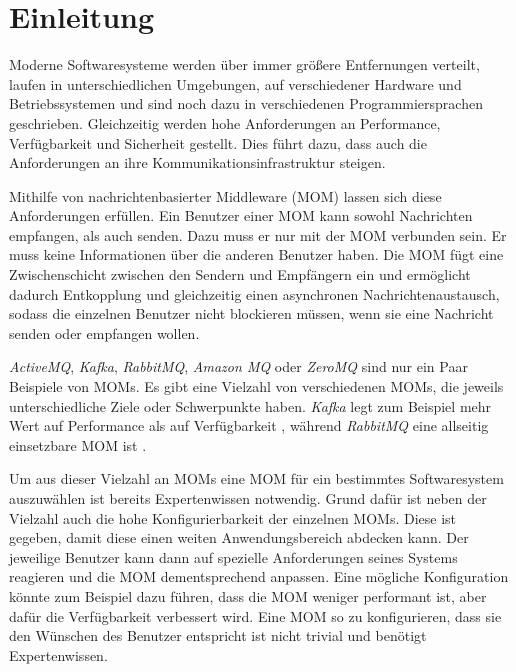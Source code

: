 
\chapter{Einleitung}
\label{ch:Introduction}
Moderne Softwaresysteme werden über immer größere Entfernungen verteilt, laufen in unterschiedlichen Umgebungen, auf verschiedener Hardware und Betriebssystemen und sind noch dazu in verschiedenen Programmiersprachen geschrieben. Gleichzeitig werden hohe Anforderungen an Performance, Verfügbarkeit und Sicherheit gestellt. Dies führt dazu, dass auch die Anforderungen an ihre Kommunikationsinfrastruktur steigen. \par
Mithilfe von nachrichtenbasierter Middleware (MOM) lassen sich diese Anforderungen erfüllen. Ein Benutzer einer MOM kann sowohl Nachrichten empfangen, als auch senden. Dazu muss er nur mit der MOM verbunden sein. Er muss keine Informationen über die anderen Benutzer haben. Die MOM fügt eine Zwischenschicht zwischen den Sendern und Empfängern ein und ermöglicht dadurch Entkopplung und gleichzeitig einen asynchronen Nachrichtenaustausch, sodass die einzelnen Benutzer nicht blockieren müssen, wenn sie eine Nachricht senden oder empfangen wollen. \par
\emph{ActiveMQ}, \emph{Kafka}, \emph{RabbitMQ}, \emph{Amazon MQ} oder \emph{ZeroMQ} sind nur ein Paar Beispiele von MOMs. Es gibt eine Vielzahl von verschiedenen MOMs, die jeweils unterschiedliche Ziele oder Schwerpunkte haben. \emph{Kafka} legt zum Beispiel mehr Wert auf Performance als auf Verfügbarkeit \cite{kafka}, während \emph{RabbitMQ} eine allseitig einsetzbare MOM ist \cite{rabbitmq}. \par
Um aus dieser Vielzahl an MOMs eine MOM für ein bestimmtes Softwaresystem auszuwählen ist bereits Expertenwissen notwendig. Grund dafür ist neben der Vielzahl auch die hohe Konfigurierbarkeit der einzelnen MOMs. Diese ist gegeben, damit diese einen weiten Anwendungsbereich abdecken kann. Der jeweilige Benutzer kann dann auf spezielle Anforderungen seines Systems reagieren und die MOM dementsprechend anpassen. Eine mögliche Konfiguration könnte zum Beispiel dazu führen, dass die MOM weniger performant ist, aber dafür die Verfügbarkeit verbessert wird. Eine MOM so zu konfigurieren, dass sie den Wünschen des Benutzer entspricht ist nicht trivial und benötigt Expertenwissen. 

